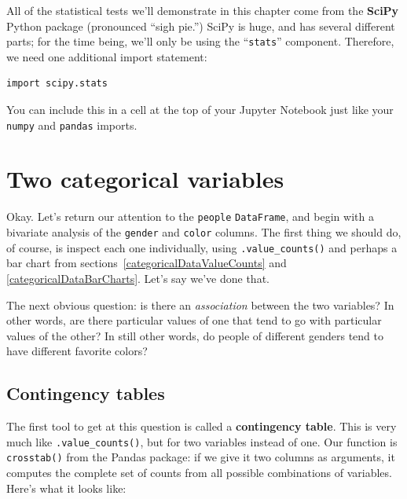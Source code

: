 
All of the statistical tests we'll demonstrate in this chapter come from the
\textbf{SciPy} Python package (pronounced ``sigh pie.'') SciPy is huge, and has
several different parts; for the time being, we'll only be using the
``\texttt{stats}'' component. Therefore, we need one additional import statement:

\begin{Verbatim}[fontsize=\small,samepage=true,frame=single,framesep=3mm]
import scipy.stats
\end{Verbatim}

You can include this in a cell at the top of your Jupyter Notebook just like
your \texttt{numpy} and \texttt{pandas} imports.


\section{Two categorical variables}


Okay. Let's return our attention to the \texttt{people} \texttt{DataFrame}, and
begin with a bivariate analysis of the \texttt{gender} and \texttt{color}
columns. The first thing we should do, of course, is inspect each one
individually, using \texttt{.value\_counts()} and perhaps a bar chart from
sections~\ref{categoricalDataValueCounts} and \ref{categoricalDataBarCharts}.
Let's say we've done that.


The next obvious question: is there an \textit{association} between the two
variables? In other words, are there particular values of one that tend to go
with particular values of the other? In still other words, do people of
different genders tend to have different favorite colors?


\subsection{Contingency tables}

The first tool to get at this question is called a \textbf{contingency table}.
This is very much like \texttt{.value\_counts()}, but for two variables instead
of one. Our function is \texttt{crosstab()} from the Pandas package: if we give
it two columns as arguments, it computes the complete set of counts from all
possible combinations of variables. Here's what it looks like:

